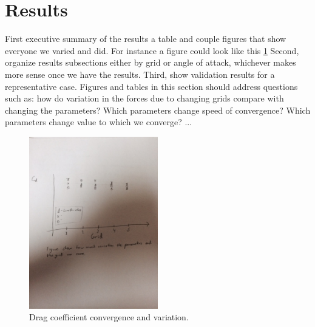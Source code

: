 
\section{Results}
First executive summary of the results a table and couple figures that show everyone we varied and did. For instance a figure could look like this \cref{fig:Cd_convergence}
Second, organize results subsections either by grid or angle of attack, whichever makes more sense once we have the results.
Third, show validation results for a representative case.
Figures and tables in this section should address questions such as: how do variation in the forces due to changing grids compare with changing the parameters? Which parameters change speed of convergence? Which parameters change value to which we converge? ...

\begin{figure}
  \centering
  \includegraphics[width=0.5\textwidth]{./fig/cd_convergence}
  \caption{Drag coefficient convergence and variation.}
  \label{fig:Cd_convergence}
\end{figure}

